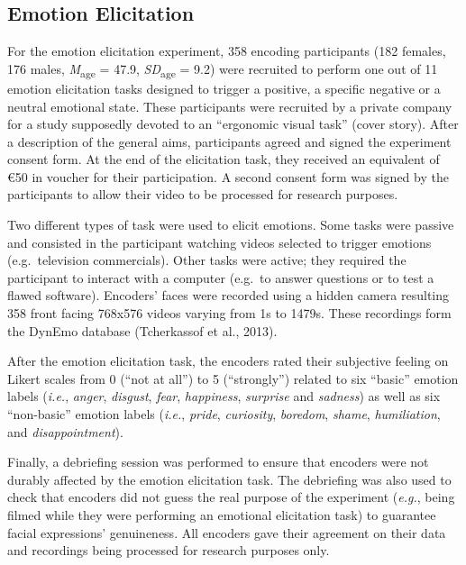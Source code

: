 \documentclass[
  english,
  doc]{apa7}
\begin{document}
\hypertarget{emotion-elicitation}{%
\subsection{Emotion Elicitation}\label{emotion-elicitation}}

For the emotion elicitation experiment, 358 encoding participants (182 females, 176 males, \emph{M}\textsubscript{age} = 47.9, \emph{SD}\textsubscript{age} = 9.2) were recruited to perform one out of 11 emotion elicitation tasks designed to trigger a positive, a specific negative or a neutral emotional state. These participants were recruited by a private company for a study supposedly devoted to an ``ergonomic visual task'' (cover story). After a description of the general aims, participants agreed and signed the experiment consent form. At the end of the elicitation task, they received an equivalent of €50 in voucher for their participation. A second consent form was signed by the participants to allow their video to be processed for research purposes.

Two different types of task were used to elicit emotions. Some tasks were passive and consisted in the participant watching videos selected to trigger emotions (e.g.~television commercials). Other tasks were active; they required the participant to interact with a computer (e.g.~to answer questions or to test a flawed software). Encoders' faces were recorded using a hidden camera resulting 358 front facing 768x576 videos varying from 1s to 1479s. These recordings form the DynEmo database (Tcherkassof et al., 2013).

After the emotion elicitation task, the encoders rated their subjective feeling on Likert scales from 0 (``not at all'') to 5 (``strongly'') related to six ``basic'' emotion labels (\emph{i.e.}, \emph{anger}, \emph{disgust}, \emph{fear}, \emph{happiness}, \emph{surprise} and \emph{sadness}) as well as six ``non-basic'' emotion labels (\emph{i.e.}, \emph{pride}, \emph{curiosity}, \emph{boredom}, \emph{shame}, \emph{humiliation}, and \emph{disappointment}).

Finally, a debriefing session was performed to ensure that encoders were not durably affected by the emotion elicitation task. The debriefing was also used to check that encoders did not guess the real purpose of the experiment (\emph{e.g.}, being filmed while they were performing an emotional elicitation task) to guarantee facial expressions' genuineness. All encoders gave their agreement on their data and recordings being processed for research purposes only.
\end{document}
